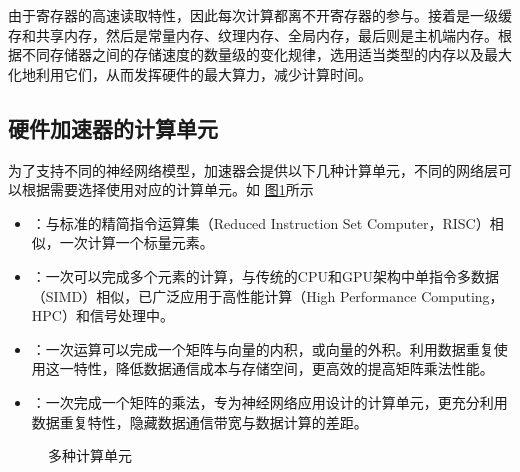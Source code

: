 \documentclass[letterpaper,10pt,english]{sphinxmanual}
\let\sphinxpxdimen\pdfpxdimen\else\newdimen\sphinxpxdimen
\begin{document}
\sphinxAtStartPar
由于寄存器的高速读取特性，因此每次计算都离不开寄存器的参与。接着是一级缓存和共享内存，然后是常量内存、纹理内存、全局内存，最后则是主机端内存。根据不同存储器之间的存储速度的数量级的变化规律，选用适当类型的内存以及最大化地利用它们，从而发挥硬件的最大算力，减少计算时间。


\subsection{硬件加速器的计算单元}
\label{\detokenize{chapter_accelerator/accelerator_architecture:compute-unit-title}}\label{\detokenize{chapter_accelerator/accelerator_architecture:id5}}
\sphinxAtStartPar
为了支持不同的神经网络模型，加速器会提供以下几种计算单元，不同的网络层可以根据需要选择使用对应的计算单元。如
\hyperref[\detokenize{chapter_accelerator/accelerator_architecture:compute-unit}]{图\ref{\detokenize{chapter_accelerator/accelerator_architecture:compute-unit}}}所示
\begin{itemize}
\item {} 
\sphinxAtStartPar
{}：与标准的精简指令运算集（Reduced Instruction Set
Computer，RISC）相似，一次计算一个标量元素。

\item {} 
\sphinxAtStartPar
{}：一次可以完成多个元素的计算，与传统的CPU和GPU架构中单指令多数据（SIMD）相似，已广泛应用于高性能计算（High
Performance Computing，HPC）和信号处理中。

\item {} 
\sphinxAtStartPar
{}：一次运算可以完成一个矩阵与向量的内积，或向量的外积。利用数据重复使用这一特性，降低数据通信成本与存储空间，更高效的提高矩阵乘法性能。

\item {} 
\sphinxAtStartPar
{}：一次完成一个矩阵的乘法，专为神经网络应用设计的计算单元，更充分利用数据重复特性，隐藏数据通信带宽与数据计算的差距。

\end{itemize}

\begin{figure}[H]
\centering
\capstart

\noindent\sphinxincludegraphics[width=800\sphinxpxdimen]{{compute_unit}.svg}
\caption{多种计算单元}\label{\detokenize{chapter_accelerator/accelerator_architecture:id8}}\label{\detokenize{chapter_accelerator/accelerator_architecture:compute-unit}}\end{figure}
\end{document}
